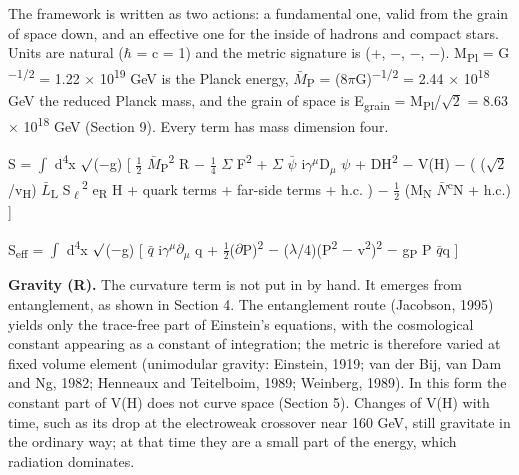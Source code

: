 \documentclass[
  11pt,
]{article}
\begin{document}
The framework is written as two actions: a fundamental one, valid from the grain of space down, and an effective one for the inside of hadrons and compact stars. Units are natural (\ensuremath{\hbar} = c = 1) and the metric signature is (+, \ensuremath{-}, \ensuremath{-}, \ensuremath{-}). M\textsubscript{Pl} = G\textsuperscript{\ensuremath{-}1/2} = 1.22 \ensuremath{\times} 10\textsuperscript{19} GeV is the Planck energy, \ensuremath{\bar{M}}\textsubscript{P} = (8\ensuremath{\pi}G)\textsuperscript{\ensuremath{-}1/2} = 2.44 \ensuremath{\times} 10\textsuperscript{18} GeV the reduced Planck mass, and the grain of space is E\textsubscript{grain} = M\textsubscript{Pl}/\ensuremath{\sqrt{2}} = 8.63 \ensuremath{\times} 10\textsuperscript{18} GeV (Section 9). Every term has mass dimension four.

S = \ensuremath{\int} d\textsuperscript{4}x \ensuremath{\surd}(\ensuremath{-}g) {[} \ensuremath{\frac{1}{2}} \ensuremath{\bar{M}}\textsubscript{P}\textsuperscript{2} R \ensuremath{-} \ensuremath{\frac{1}{4}} \ensuremath{\Sigma} F\textsuperscript{2} + \ensuremath{\Sigma} \ensuremath{\bar{\ensuremath{\psi}}} i\ensuremath{\gamma}\ensuremath{^{\mu}}D\ensuremath{_{\mu}} \ensuremath{\psi} + \textbar DH\textbar{}\textsuperscript{2} \ensuremath{-} V(H) \ensuremath{-} ( (\ensuremath{\sqrt{2}}/v\textsubscript{H}) \ensuremath{\bar{L}}\textsubscript{L} S\textsubscript{\ensuremath{\ell}}\textsuperscript{2} e\textsubscript{R} H + quark terms + far-side terms + h.c. ) \ensuremath{-} \ensuremath{\frac{1}{2}} (M\textsubscript{N} \ensuremath{\bar{N}}\textsuperscript{c}N + h.c.) {]}

S\textsubscript{eff} = \ensuremath{\int} d\textsuperscript{4}x \ensuremath{\surd}(\ensuremath{-}g) {[} \ensuremath{\bar{q}} i\ensuremath{\gamma}\ensuremath{^{\mu}}\ensuremath{\partial}\ensuremath{_{\mu}} q + \ensuremath{\frac{1}{2}}(\ensuremath{\partial}P)\textsuperscript{2} \ensuremath{-} (\ensuremath{\lambda}/4)(P\textsuperscript{2} \ensuremath{-} v\textsuperscript{2})\textsuperscript{2} \ensuremath{-} g\textsubscript{P} P \ensuremath{\bar{q}}q {]}

\textbf{Gravity (R).} The curvature term is not put in by hand. It emerges from entanglement, as shown in Section 4. The entanglement route (Jacobson, 1995) yields only the trace-free part of Einstein's equations, with the cosmological constant appearing as a constant of integration; the metric is therefore varied at fixed volume element (unimodular gravity: Einstein, 1919; van der Bij, van Dam and Ng, 1982; Henneaux and Teitelboim, 1989; Weinberg, 1989). In this form the constant part of V(H) does not curve space (Section 5). Changes of V(H) with time, such as its drop at the electroweak crossover near 160 GeV, still gravitate in the ordinary way; at that time they are a small part of the energy, which radiation dominates.
\end{document}
